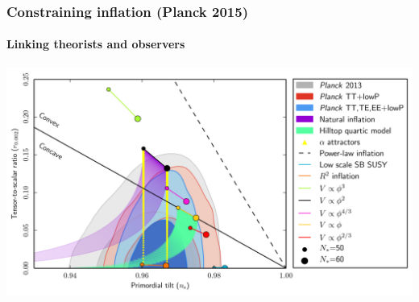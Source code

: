 \documentclass[%
]{beamer}
\begin{document}
\begin{frame}
    \frametitle{Constraining inflation (Planck 2015)}
    \framesubtitle{Linking theorists and observers}
    \includegraphics[width=\textwidth]{./figures/V18TTvsTTTEEEvs2013_120mmR.pdf}
\end{frame}
\end{document}
